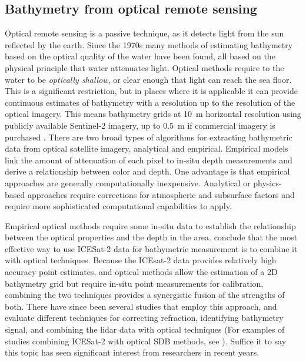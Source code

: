 \subsection{Bathymetry from optical remote sensing}
Optical remote sensing is a passive technique, as it detects light from the sun reflected by the earth. Since the 1970s many methods of estimating bathymetry based on the optical quality of the water have been found, all based on the physical principle that water attenuates light. Optical methods require to the water to be \emph{optically shallow}, or clear enough that light can reach the sea floor. This is a significant restriction, but in places where it is applicable it can provide continuous estimates of bathymetry with a resolution up to the resolution of the optical imagery. This means bathymetry grids at 10~m horizontal resolution using publicly available Sentinel-2 imagery, up to 0.5~m if commercial imagery is purchased \parencite{Babbel2021a,LeQuilleuc2022b,Pike2019}. There are two broad types of algorithms for extracting bathymetric data from optical satellite imagery, analytical and empirical. Empirical models link the amount of attenuation of each pixel to in-situ depth measurements and derive a relationship between color and depth. One advantage is that empirical approaches are generally computationally inexpensive. Analytical or physics-based approaches require corrections for atmospheric and subsurface factors \parencite{Turner2021} and require more sophisticated computational capabilities to apply.

Empirical optical methods require some in-situ data to establish the relationship between the optical properties and the depth in the area. \cite{Parrish2019} conclude that the most effective way to use ICESat-2 data for bathymetric measurement is to combine it with optical techniques. Because the ICEsat-2 data provides relatively high accuracy point estimates, and optical methods allow the estimation of a 2D bathymetry grid but require in-situ point measurements for calibration, combining the two techniques provides a synergistic fusion of the strengths of both. There have since been several studies that employ this approach, and evaluate different techniques for correcting refraction, identifying bathymetry signal, and combining the lidar data with optical techniques (For examples of studies combining ICESat-2 with optical SDB methods, see \cite{Geyman2019,Pike2019,Ma2020,Lee2021,Albright2021,Ranndal2021,Gleason2021,Thomas2021d,Babbel2021a,Hsu2021,Cao2021,Xie2021,Surisetty2022,Zhong2022a,Zheng2022,Daly2022,Xu2022,Magruder2020,Thomas2022,LeQuilleuc2022b}). Suffice it to say this topic has seen significant interest from researchers in recent years.

